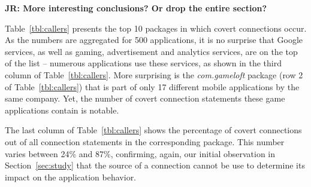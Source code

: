 {\bf JR: More interesting conclusions? Or drop the entire section?}

Table~\ref{tbl:callers} presents the top 10 packages in which
covert connections occur.  As the numbers are aggregated for
500 applications, it is no surprise that Google services, as well
as gaming, advertisement and analytics services, are on the top of the
list -- numerous applications use these services, as shown in the third
column of Table~\ref{tbl:callers}.
More surprising is the \emph{com.gameloft} package (row 2 of Table~\ref{tbl:callers}) that is part of only 17 different mobile applications by the same company. Yet, the number of covert connection statements these game applications contain is notable. 

The last column of Table~\ref{tbl:callers} shows the percentage of covert connections out of all connection statements in the corresponding package. This number varies between 24\% and 87\%, confirming, again, our initial observation in Section~\ref{sec:study} that the source of a connection cannot be use to determine its impact on the application behavior. 


 






